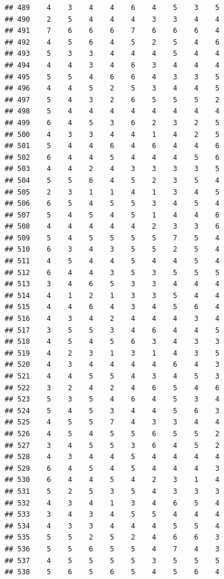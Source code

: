 \documentclass[
]{article}
\begin{document}
\begin{verbatim}
## 489    4    3    4    4    6    4    5    3    5
## 490    2    5    4    4    4    3    3    4    4
## 491    7    6    6    6    7    6    6    6    4
## 492    4    5    6    4    5    2    5    4    6
## 493    5    3    3    4    4    4    5    4    4
## 494    4    4    3    4    6    3    4    4    4
## 495    5    5    4    6    6    4    3    3    5
## 496    4    4    5    2    5    3    4    4    5
## 497    5    4    3    2    6    5    5    5    2
## 498    5    4    4    4    4    4    4    4    4
## 499    6    4    5    3    6    2    3    2    5
## 500    4    3    3    4    4    1    4    2    5
## 501    5    4    4    6    4    6    4    4    6
## 502    6    4    4    5    4    4    4    5    6
## 503    4    4    2    4    3    3    3    3    5
## 504    5    5    6    4    5    2    3    5    4
## 505    2    3    1    1    4    1    3    4    5
## 506    6    5    4    5    5    3    4    5    4
## 507    5    4    5    4    5    1    4    4    6
## 508    4    4    4    4    4    2    3    3    6
## 509    5    4    5    5    5    5    7    5    4
## 510    6    3    4    3    5    5    2    5    4
## 511    4    5    4    4    5    4    4    5    4
## 512    6    4    4    3    5    3    5    5    5
## 513    3    4    6    5    3    3    4    4    4
## 514    4    1    2    1    3    3    5    4    4
## 515    4    4    6    4    3    4    5    6    4
## 516    4    3    4    2    4    4    4    3    4
## 517    3    5    5    3    4    6    4    4    5
## 518    4    5    4    5    6    3    4    3    3
## 519    4    2    3    1    3    1    4    3    5
## 520    4    3    4    4    4    4    6    4    3
## 521    4    4    5    5    4    3    4    5    3
## 522    3    2    4    2    4    6    5    4    6
## 523    5    3    5    4    6    4    5    3    4
## 524    5    4    5    3    4    4    5    6    3
## 525    4    5    5    7    4    3    3    4    4
## 526    4    5    4    5    5    6    5    5    2
## 527    3    4    5    5    3    6    4    5    2
## 528    4    3    4    4    5    4    4    4    4
## 529    6    4    5    4    5    4    4    4    3
## 530    6    4    4    5    4    2    3    1    4
## 531    5    2    5    3    5    4    3    3    3
## 532    4    3    4    1    3    4    6    5    4
## 533    3    4    3    4    5    5    4    4    4
## 534    4    3    3    4    4    4    5    5    4
## 535    5    5    2    5    2    4    6    6    3
## 536    5    5    6    5    5    4    7    4    3
## 537    4    5    5    5    5    3    5    5    5
## 538    5    6    5    6    5    4    5    6    4

\end{verbatim}
\end{document}
